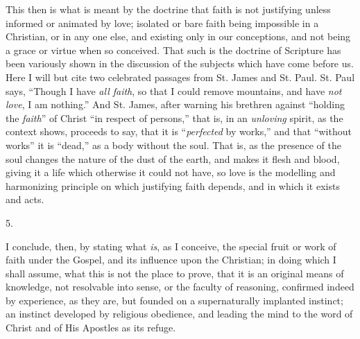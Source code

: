 This then is what is meant by the doctrine that faith is not
justifying unless informed or animated by love; isolated or bare faith
being impossible in a Christian, or in any one else, and existing only
in our conceptions, and not being a grace or virtue when so conceived.
That such is the doctrine of Scripture has been variously shown in the
discussion of the subjects which have come before us. Here I will but
cite two celebrated passages from St. James and St. Paul. St. Paul
says, ``Though I have \emph{all faith}, so that I could remove
mountains, and have \emph{not love}, I am nothing.'' And St.
James, after warning his brethren against ``holding the \emph{faith}''
of Christ ``in respect of persons,'' that is, in an \emph{unloving}
spirit, as the context shows, proceeds to say, that it is ``\emph{perfected}
by works,'' and that ``without works'' it is
``dead,'' as a body without the soul. That is, as the presence
of the soul changes the nature of the dust of the earth, and makes it
flesh and blood, giving it a life which otherwise it could not have,
so love is the modelling and harmonizing principle on which justifying
faith depends, and in which it exists and acts.

5.

I conclude, then, by stating what \emph{is}, as I conceive, the
special fruit or work of faith under the Gospel, and its
influence upon the Christian; in doing which I shall assume, what this
is not the place to prove, that it is an original means of knowledge,
not resolvable into sense, or the faculty of reasoning, confirmed
indeed by experience, as they are, but founded on a supernaturally
implanted instinct; an instinct developed by religious obedience, and
leading the mind to the word of Christ and of His Apostles as its
refuge.

